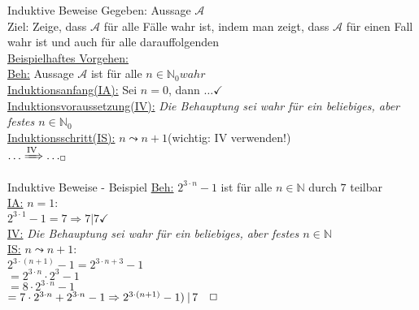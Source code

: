 \begin{frame}{Induktive Beweise}
 Gegeben: Aussage $\mathcal{A}$\\
 Ziel: Zeige, dass $\mathcal{A}$ für alle Fälle wahr ist, indem man zeigt, dass $\mathcal{A}$ für einen Fall wahr ist und auch für alle darauffolgenden\\
 \underline{Beispielhaftes Vorgehen:}\\
 \underline{Beh:} Aussage $\mathcal{A}$ ist für alle $n\in\mathbb{N}_{0} wahr$\\
 \underline{Induktionsanfang(IA):} Sei $n=0$, dann $\dots\checkmark$\\
 \underline{Induktionsvoraussetzung(IV):} \emph{Die Behauptung sei wahr für ein beliebiges, aber festes $n\in\mathbb{N}_{0}$}\\
 \underline{Induktionsschritt(IS):} $n\leadsto n+1$\hfill (wichtig: IV verwenden!)\\
 \qquad $\dots\xRightarrow{\text{IV}}\dots _{\Box}$
\end{frame}

\begin{frame}{Induktive Beweise - Beispiel}
 \underline{Beh:} $2^{3\cdot n}-1$ ist für alle $n\in\mathbb{N}$ durch $7$ teilbar\\
 \underline{IA:} $n=1:$\\
 \qquad $2^{3\cdot 1}-1=7 \Rightarrow 7\vert 7\checkmark$\\
 \underline{IV:} \emph{Die Behauptung sei wahr für ein beliebiges, aber festes $n\in\mathbb{N}$}\\
 \underline{IS:} $n\leadsto n+1:$\\
 \qquad $2^{3\cdot(n+1)}-1 = 2^{3\cdot n+3}-1$\\
 \pause
 \qquad $=2^{3\cdot n}\cdot 2^{3}-1$\\
 \pause
 \qquad $=8\cdot 2^{3\cdot n}-1$\\
 \pause
 \qquad $=7\cdot2^{3\cdot n}+2^{3\cdot n}-1\Rightarrow 2^{3\cdot(n+1)}-1)\medspace\vert\thinspace 7\quad\Box$\\
\end{frame}

